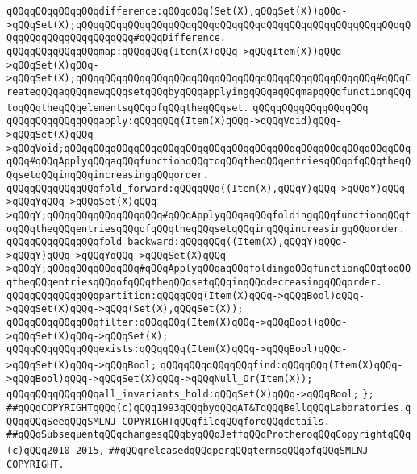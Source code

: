 \newline
\verb|qQQqqQQqqQQqqQQqdifference:qQQqqQQq(Set(X),qQQqSet(X))qQQq->qQQqSet(X);qQQqqQQqqQQqqQQqqQQqqQQqqQQqqQQqqQQqqQQqqQQqqQQqqQQqqQQqqQQqqQQqqQQqqQQqqQQqqQQq#qQQqDifference.|\newline
\newline
\verb|qQQqqQQqqQQqqQQqmap:qQQqqQQq(Item(X)qQQq->qQQqItem(X))qQQq->qQQqSet(X)qQQq->qQQqSet(X);qQQqqQQqqQQqqQQqqQQqqQQqqQQqqQQqqQQqqQQqqQQqqQQqqQQq#qQQqCreateqQQqaqQQqnewqQQqsetqQQqbyqQQqapplyingqQQqaqQQqmapqQQqfunctionqQQqtoqQQqtheqQQqelementsqQQqofqQQqtheqQQqset.|\newline
\verb|qQQqqQQqqQQqqQQqqQQq|\newline
\verb|qQQqqQQqqQQqqQQqapply:qQQqqQQq(Item(X)qQQq->qQQqVoid)qQQq->qQQqSet(X)qQQq->qQQqVoid;qQQqqQQqqQQqqQQqqQQqqQQqqQQqqQQqqQQqqQQqqQQqqQQqqQQqqQQqqQQqqQQq#qQQqApplyqQQqaqQQqfunctionqQQqtoqQQqtheqQQqentriesqQQqofqQQqtheqQQqsetqQQqinqQQqincreasingqQQqorder.|\newline
\newline
\verb|qQQqqQQqqQQqqQQqfold_forward:qQQqqQQq((Item(X),qQQqY)qQQq->qQQqY)qQQq->qQQqYqQQq->qQQqSet(X)qQQq->qQQqY;qQQqqQQqqQQqqQQqqQQq#qQQqApplyqQQqaqQQqfoldingqQQqfunctionqQQqtoqQQqtheqQQqentriesqQQqofqQQqtheqQQqsetqQQqinqQQqincreasingqQQqorder.|\newline
\newline
\verb|qQQqqQQqqQQqqQQqfold_backward:qQQqqQQq((Item(X),qQQqY)qQQq->qQQqY)qQQq->qQQqYqQQq->qQQqSet(X)qQQq->qQQqY;qQQqqQQqqQQqqQQq#qQQqApplyqQQqaqQQqfoldingqQQqfunctionqQQqtoqQQqtheqQQqentriesqQQqofqQQqtheqQQqsetqQQqinqQQqdecreasingqQQqorder.|\newline
\newline
\verb|qQQqqQQqqQQqqQQqpartition:qQQqqQQq(Item(X)qQQq->qQQqBool)qQQq->qQQqSet(X)qQQq->qQQq(Set(X),qQQqSet(X));|\newline
\newline
\verb|qQQqqQQqqQQqqQQqfilter:qQQqqQQq(Item(X)qQQq->qQQqBool)qQQq->qQQqSet(X)qQQq->qQQqSet(X);|\newline
\newline
\verb|qQQqqQQqqQQqqQQqexists:qQQqqQQq(Item(X)qQQq->qQQqBool)qQQq->qQQqSet(X)qQQq->qQQqBool;|\newline
\newline
\verb|qQQqqQQqqQQqqQQqfind:qQQqqQQq(Item(X)qQQq->qQQqBool)qQQq->qQQqSet(X)qQQq->qQQqNull_Or(Item(X));|\newline
\newline
\verb|qQQqqQQqqQQqqQQqall_invariants_hold:qQQqSet(X)qQQq->qQQqBool;|\newline
\verb|};|\newline
\newline
\newline
\verb|##qQQqCOPYRIGHTqQQq(c)qQQq1993qQQqbyqQQqAT&TqQQqBellqQQqLaboratories.qQQqqQQqSeeqQQqSMLNJ-COPYRIGHTqQQqfileqQQqforqQQqdetails.|\newline
\verb|##qQQqSubsequentqQQqchangesqQQqbyqQQqJeffqQQqProtheroqQQqCopyrightqQQq(c)qQQq2010-2015,|\newline
\verb|##qQQqreleasedqQQqperqQQqtermsqQQqofqQQqSMLNJ-COPYRIGHT.|\newline

